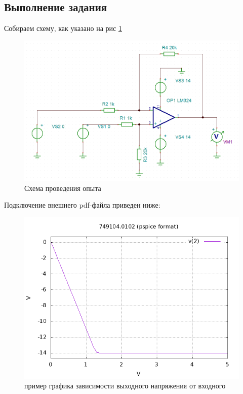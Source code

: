 \subsection{Выполнение задания}
Собираем схему, как указано на рис \ref{experiment1}
\begin{figure}[!ht]
	\centering
	\includegraphics[scale=0.6]{schema1}
	\caption{Схема проведения опыта}
	\label{experiment1}
\end{figure}

Подключение внешнего pdf-файла приведен ниже:
\newpage


\begin{figure}
	\centering
	\includegraphics[scale=0.6]{749104_inv}
	\caption{пример графика зависимости выходного напряжения от входного}
\end{figure}





\tableofcontents
\lstlistoflistings

